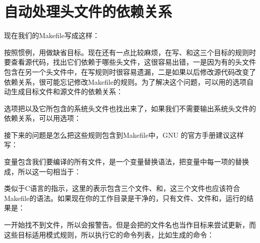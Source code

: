 
\section{自动处理头文件的依赖关系}
%
现在我们的Makefile写成这样：




按照惯例，用做缺省目标。现在还有一点比较麻烦，在写、和这三个目标的规则时要查看源代码，找出它们依赖于哪些头文件，这很容易出错，一是因为有的头文件包含在另一个头文件中，在写规则时很容易遗漏，二是如果以后修改源代码改变了依赖关系，很可能忘记修改Makefile的规则。为了解决这个问题，可以用的选项自动生成目标文件和源文件的依赖关系：




选项把以及它所包含的系统头文件也找出来了，如果我们不需要输出系统头文件的依赖关系，可以用选项：




接下来的问题是怎么把这些规则包含到Makefile中，GNU 的官方手册建议这样写：




变量包含我们要编译的所有文件，是一个变量替换语法，把变量中每一项的替换成，所以这一句相当于：




类似于C语言的指示，这里的表示包含三个文件、和，这三个文件也应该符合Makefile的语法。如果现在你的工作目录是干净的，只有文件、文件和，运行的结果是：




一开始找不到文件，所以会报警告。但是会把的文件名也当作目标来尝试更新，而这些目标适用模式规则，所以执行它的命令列表，比如生成的命令：


